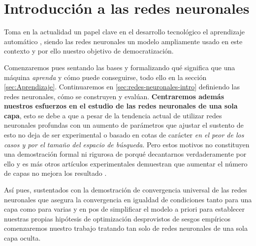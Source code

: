 
\chapter{Introducción a las redes neuronales} 
\label{chapter:Introduction-neuronal-networks}
Toma en la actualidad un papel clave en el desarrollo tecnológico el aprendizaje automático
\cite{importancia-arte-aprendizaje-automatico}, siendo 
las redes neuronales un modelo ampliamente usado en este contexto y por ello 
nuestro objetivo de democratización. 

Comenzaremos pues  sentando las bases y 
formalizando  
qué significa 
que una máquina \textit{aprenda}  y cómo puede conseguirse, 
todo ello en la sección \ref{sec:Aprendizaje}.
Continuaremos en \ref{sec:redes-neuronales-intro} 
definiendo las redes neuronales, cómo se construyen y evalúan. 
\label{motivo-una-capa}
\textbf{Centraremos además nuestros esfuerzos en el estudio de las redes neuronales de una sola capa}, 
esto se debe a que a pesar de la tendencia actual de utilizar redes neuronales profundas con 
un aumento de parámetros que ajustar 
\cite{a-universal-law-of-Robustness} \cite{CHAI2021100134} el sustento de esto no deja de ser experimental 
o basado en cotas de carácter \textit{en el peor de los casos y por el tamaño del espacio de búsqueda}.
Pero estos motivos no constituyen una demostración formal ni rigurosa de porqué decantarnos verdaderamente por 
ello y es más otros artículos experimentales demuestran que aumentar el número de capas no mejora los resultado 
\cite{DBLP:conf/iwann/Linan-Villafranca21}. 

Así pues, sustentados con la demostración de convergencia universal \cite{HORNIK1989359}
de las redes neuronales que asegura la convergencia en igualdad de condiciones 
tanto para una capa como para varias
y en pos de simplificar el modelo a priori 
para establecer nuestras propias hipótesis de optimización desprovistos
de sesgos empíricos comenzaremos nuestro trabajo tratando tan solo de redes neuronales de una sola capa oculta.